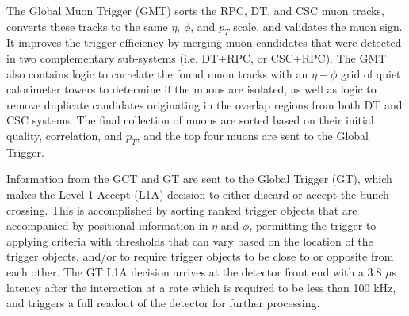 The Global Muon Trigger (GMT) sorts the RPC, DT, and CSC muon tracks, converts these tracks to the same $\eta$, $\phi$, and $p_{T}$ scale, and validates the muon sign. It improves the trigger efficiency by merging muon candidates that were detected in two complementary sub-systems (i.e. DT+RPC, or CSC+RPC). The GMT also contains logic to correlate the found muon tracks with an $\eta-\phi$ grid of quiet calorimeter towers to determine if the muons are isolated, as well as logic to remove duplicate candidates originating in the overlap regions from both DT and CSC systems. The final collection of muons are sorted based on their initial quality, correlation, and $p_{T}$, and the top four muons are sent to the Global Trigger. 

Information from the GCT and GT are sent to the Global Trigger (GT), which makes the Level-1 Accept (L1A) decision to either discard or accept the bunch crossing. This is accomplished by sorting ranked trigger objects that are accompanied by positional information in $\eta$ and $\phi$, permitting the trigger to applying criteria with thresholds that can vary based on the location of the trigger objects, and/or to require trigger objects to be close to or opposite from each other. The GT L1A decision arrives at the detector front end with a 3.8 $\mu$s latency after the interaction at a rate which is required to be less than 100 kHz, and triggers a full readout of the detector for further processing.

